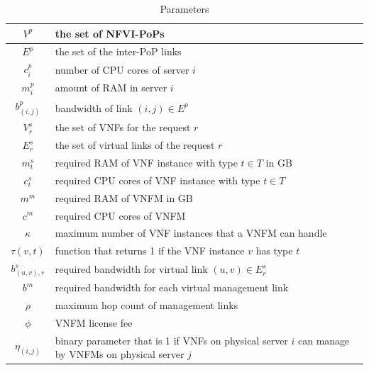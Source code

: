 \begin{table}
    \caption{Parameters}
    \label{tbl:parameters}
    \begin{small}
    \begin{center}\begin{tabular}{|c|p{}|}
    \hline
    \(V^p\) & the set of NFVI-PoPs \\
    \hline
    \(E^p\) & the set of the inter-PoP links \\
    \hline
    \(c^p_i\) & number of CPU cores of server \(i\) \\
    \hline
    \(m^p_i\) & amount of RAM in server \(i\) \\
    \hline
    \(b^p_(i,j)\) & bandwidth of link \((i, j) \in E^p \) \\
    \hline
    \(V^s_r\) & the set of VNFs for the request \(r\) \\
    \hline
    \(E^s_r\) & the set of virtual links of the request \(r\) \\
    \hline
    \(m^s_t\) & required RAM of VNF instance with type \(t \in T\) in GB \\
    \hline
    \(c^s_t\) & required CPU cores of VNF instance with type \(t \in T\) \\
    \hline
    \(m^m\) & required RAM of VNFM in GB \\
    \hline
    \(c^m\) & required CPU cores of VNFM \\
    \hline
    \(\kappa\) & maximum number of VNF instances that a VNFM can handle \\
    \hline
    \(\tau(v, t)\) & function that returns 1 if the VNF instance \(v\) has type \(t\)  \\
    \hline
    \(b^s_{(u, v),r}\) & required bandwidth for virtual link \((u, v) \in E^s_r\) \\
    \hline
    \(b^m\) & required bandwidth for each virtual management link \\
    \hline
    \(\rho\) & maximum hop count of management links \\
    \hline
    \(\phi\) & VNFM license fee \\
    \hline
    \(\eta_{(i, j)}\) & binary parameter that is 1 if VNFs on physical server \(i\) can manage by VNFMs on physical server \(j\) \\
    \hline
    \end{tabular}\end{center}
    \end{small}
\end{table}


